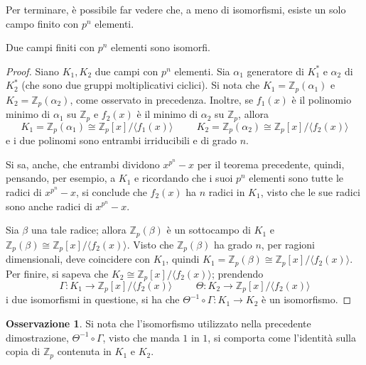 \documentclass[11pt, a4paper]{scrartcl}
\theoremstyle{definition}
\numberwithin{esempio}{section}
\theoremstyle{definition}
\newtheorem{obs}{Osservazione}
\numberwithin{obs}{section}
\numberwithin{nota}{section}
\numberwithin{equation}{subsection}
\begin{document}
\noindent Per terminare, \`e possibile far vedere che, a meno di isomorfismi, esiste un solo campo finito con $p^n$ elementi.
\begin{teorema}
	{}{}
	Due campi finiti con $p^n$ elementi sono isomorfi.
	\begin{proof}
		Siano $K_1,K_2$ due campi con $p^n$ elementi.
		Sia $\alpha _1$ generatore di $K_1^*$ e $\alpha _2$ di $K_2^*$ (che sono due gruppi moltiplicativi ciclici).
		Si nota che $K_1=\mathbb{Z}_p(\alpha _1)$ e $K_2 = \mathbb{Z}_p(\alpha _2)$, come osservato in precedenza.
		Inoltre, se $f_1(x)$ \`e il polinomio minimo di $\alpha _1$ su $\mathbb{Z}_p$ e $f_2(x)$ \`e il minimo di $\alpha _2$ su $\mathbb{Z}_p$, allora
		\[
			K_1=\mathbb{Z}_p(\alpha _1) \cong \mathbb{Z}_p[x] / \langle f_1(x) \rangle \hspace{1cm}K_2 = \mathbb{Z}_p(\alpha _2) \cong \mathbb{Z}_p[x] / \langle f_2(x) \rangle
		\] 
		e i due polinomi sono entrambi irriducibili e di grado $n$.

		Si sa, anche, che entrambi dividono $x^{p^n} -x$ per il teorema precedente, quindi, pensando, per esempio, a $K_1$ e ricordando che i suoi $p^n$ elementi sono tutte le radici di $x^{p^n} -x$, si conclude che $f_2(x)$ ha $n$ radici in $K_1$, visto che le sue radici sono anche radici di $x^{p^n} -x$.

		Sia $\beta $ una tale radice; allora $\mathbb{Z}_p(\beta )$ \`e un sottocampo di $K_1$ e $\mathbb{Z}_p(\beta )\cong \mathbb{Z}_p[x] /\langle f_2(x) \rangle$.
		Visto che $\mathbb{Z}_p(\beta )$ ha grado $n$, per ragioni dimensionali, deve coincidere con $K_1$, quindi $K_1 = \mathbb{Z}_p(\beta ) \cong \mathbb{Z}_p[x] / \langle f_2(x) \rangle$.
		Per finire, si sapeva che $K_2\cong \mathbb{Z}_p[x] / \langle f_2(x) \rangle$; prendendo 
		\[
			\Gamma:K_1\to \mathbb{Z}_p[x] / \langle f_2(x) \rangle\hspace{1cm}\Theta :K_2 \to \mathbb{Z}_p [x] / \langle f_2(x) \rangle
		\] 
		i due isomorfismi in questione, si ha che $\Theta^{-1} \circ \Gamma:K_1\to K_2$ \`e un isomorfismo.
	\end{proof}
\end{teorema}
\begin{obs}
	Si nota che l'isomorfismo utilizzato nella precedente dimostrazione, $\Theta^{-1} \circ \Gamma$, visto che manda $1$ in $1$, si comporta come l'identit\`a sulla copia di $\mathbb{Z}_p$ contenuta in $K_1$ e $K_2$.
\end{obs}
\end{document}
